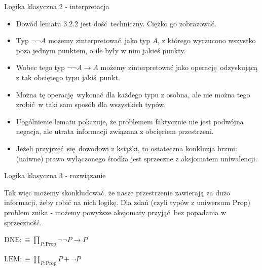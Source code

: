 \documentclass{beamer}
\newcommand{\defn}{:\equiv}
\newcommand{\Prop}{\text{Prop}}
\begin{document}
\begin{frame}{Logika klasyczna 2 - interpretacja}
\begin{itemize}
	\item Dowód lematu 3.2.2 jest dość techniczny. Ciężko go zobrazować.
	\item Typ $\neg\neg A$ możemy zinterpretować jako typ $A$, z którego wyrzucono wszystko poza jednym punktem, o ile były w nim jakieś punkty.
	\item Wobec tego typ $\neg\neg A \to A$ możemy zinterpretować jako operację odzyskującą z tak obciętego typu jakiś punkt.
	\item Można tę operację wykonać dla każdego typu z osobna, ale nie można tego zrobić w taki sam sposób dla wszystkich typów.
	\item Uogólnienie lematu pokazuje, że problemem faktycznie nie jest podwójna negacja, ale utrata informacji związana z obcięciem przestrzeni.
	\item Jeżeli przyjrzeć się dowodowi z książki, to ostateczna konkluzja brzmi: (naiwne) prawo wyłączonego środka jest sprzeczne z aksjomatem uniwalencji.
\end{itemize}
\end{frame}

\begin{frame}{Logika klasyczna 3 - rozwiązanie}

Tak więc możemy skonkludować, że nasze przestrzenie zawierają za dużo informacji, żeby robić na nich logikę. Dla zdań (czyli typów z uniwersum $\Prop$) problem znika - możemy powyższe aksjomaty przyjąć bez popadania w sprzeczność.

\begin{definition}
$\text{DNE} \defn \prod_{P : \Prop} \neg\neg P \to P$
\end{definition}

\begin{definition}
$\text{LEM} \defn \prod_{P : \Prop} P + \neg P$
\end{definition}

\end{frame}
\end{document}
